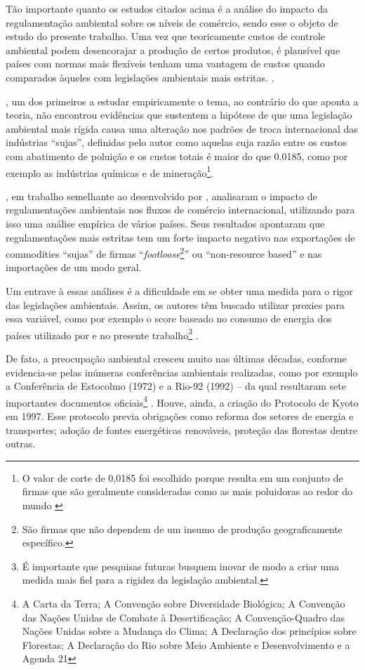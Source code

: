 Tão importante quanto os estudos citados acima é a análise do impacto da regulamentação ambiental sobre os níveis de comércio, sendo esse o objeto de estudo do presente trabalho. Uma vez que teoricamente custos de controle ambiental podem desencorajar a produção de certos produtos, é plausível que países com normas mais flexíveis tenham uma vantagem de custos quando comparados àqueles com legislações ambientais mais estritas. \cite{Pethig1976, Siebert1977, McGuire1982}.

, um dos primeiros a estudar empiricamente o tema, ao contrário do que aponta a teoria, não encontrou evidências que sustentem a hipótese de que uma legislação ambiental mais rígida causa uma alteração nos padrões de troca internacional das indústrias “sujas”, definidas pelo autor como aquelas cuja razão entre os custos com abatimento de poluição e os custos totais é maior do que 0.0185, como por exemplo as indústrias químicas e de mineração\footnote{O valor de corte de 0,0185 foi escolhido porque resulta em um conjunto de firmas que são geralmente consideradas como as mais poluidoras ao redor do mundo \cite{Tobey1990}}. 

, em trabalho semelhante ao desenvolvido por , analisaram o impacto de regulamentações ambientais nos fluxos de comércio internacional, utilizando para isso uma análise empírica de vários países. Seus resultados apontaram que regulamentações mais estritas tem um forte impacto negativo nas exportações de commodities “sujas” de firmas “\textit{footloose}\footnote{São firmas que não dependem de um insumo de produção geograficamente específico.}”  ou “non-resource based” e nas importações de um modo geral. 

Um entrave à essas análises é a dificuldade em se obter uma medida para o rigor das legislações ambientais. Assim, os autores têm buscado utilizar proxies para essa variável, como por exemplo o score baseado no consumo de energia dos países utilizado por  e no presente trabalho\footnote{É importante que pesquisas futuras busquem inovar de modo a criar uma medida mais fiel para a rigidez da legislação ambiental.} .

De fato, a preocupação ambiental cresceu muito nas últimas décadas, conforme evidencia-se pelas inúmeras conferências ambientais realizadas, como por exemplo a Conferência de Estocolmo (1972) e a Rio-92 (1992) – da qual resultaram sete importantes documentos oficiais\footnote{A Carta da Terra; A Convenção sobre Diversidade Biológica; A Convenção das Nações Unidas de Combate à Desertificação; A Convenção-Quadro das Nações Unidas sobre a Mudança do Clima; A Declaração dos princípios sobre Florestas; A Declaração do Rio sobre Meio Ambiente e Desenvolvimento e a Agenda 21} . Houve, ainda, a criação do Protocolo de Kyoto em 1997. Esse protocolo previa obrigações como reforma dos setores de energia e transportes; adoção de fontes energéticas renováveis, proteção das florestas dentre outras.

